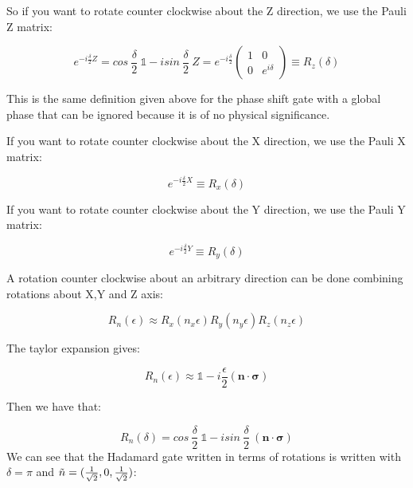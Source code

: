 So if you want to rotate counter clockwise about the Z direction, we use the Pauli Z matrix: 

\begin{equation}
    e^{-i \frac{\delta}{2}Z} = cos \ \frac{\delta}{2} \ \mathds{1} - i sin \ \frac{\delta}{2} \ Z = e^{-i \frac{\delta}{2}} \begin{pmatrix}
    1 & 0 \\
    0 & e^{i \delta}
    \end{pmatrix} \equiv R_z (\delta)
\end{equation}

This is the same definition given above for the phase shift gate with a global phase that can be ignored because it is of no physical significance.

If you want to rotate counter clockwise about the X direction, we use the Pauli X matrix: 

\begin{equation}
    e^{-i \frac{\delta}{2}X} \equiv R_x (\delta)
\end{equation}

If you want to rotate counter clockwise about the Y direction, we use the Pauli Y matrix: 

\begin{equation}
    e^{-i \frac{\delta}{2}Y} \equiv R_y (\delta)
\end{equation}

A rotation counter clockwise about an arbitrary direction can be done combining rotations about X,Y and Z axis:

\begin{equation}
    R_n(\epsilon) \approx R_x(n_x\epsilon)R_y(n_y\epsilon)R_z(n_z\epsilon)
\end{equation}

The taylor expansion gives: 

\begin{equation}
    R_n(\epsilon) \approx \mathds{1} - i \frac{\epsilon}{2} (\mathbf{n}\cdot \mathbf{\sigma})
\end{equation}

Then we have that:

\begin{equation}
    R_n(\delta) = cos \ \frac{\delta}{2} \ \mathds{1} - i sin \ \frac{\delta}{2} \ (\mathbf{n}\cdot \mathbf{\sigma})
\end{equation}
We can see that the Hadamard gate written in terms of rotations is written with $\delta = \pi$ and $\Tilde{n} = (\frac{1}{\sqrt{2}},0,\frac{1}{\sqrt{2}})$:


